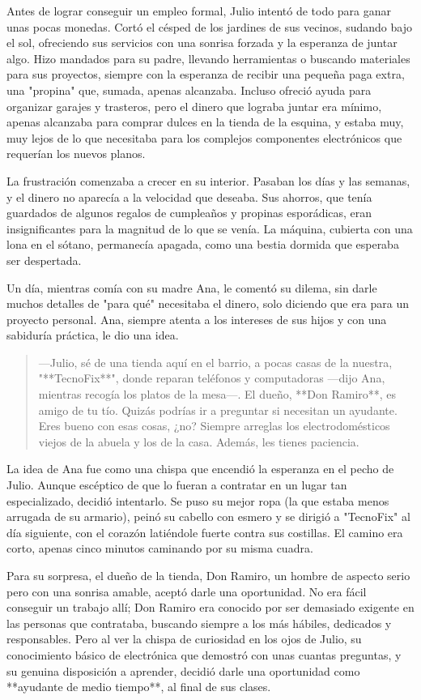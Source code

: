 \documentclass[a4paper,12pt]{book}
\begin{document}
Antes de lograr conseguir un empleo formal, Julio intentó de todo para ganar unas pocas monedas. Cortó el césped de los jardines de sus vecinos, sudando bajo el sol, ofreciendo sus servicios con una sonrisa forzada y la esperanza de juntar algo. Hizo mandados para su padre, llevando herramientas o buscando materiales para sus proyectos, siempre con la esperanza de recibir una pequeña paga extra, una "propina" que, sumada, apenas alcanzaba. Incluso ofreció ayuda para organizar garajes y trasteros, pero el dinero que lograba juntar era mínimo, apenas alcanzaba para comprar dulces en la tienda de la esquina, y estaba muy, muy lejos de lo que necesitaba para los complejos componentes electrónicos que requerían los nuevos planos.

La frustración comenzaba a crecer en su interior. Pasaban los días y las semanas, y el dinero no aparecía a la velocidad que deseaba. Sus ahorros, que tenía guardados de algunos regalos de cumpleaños y propinas esporádicas, eran insignificantes para la magnitud de lo que se venía. La máquina, cubierta con una lona en el sótano, permanecía apagada, como una bestia dormida que esperaba ser despertada.

Un día, mientras comía con su madre Ana, le comentó su dilema, sin darle muchos detalles de "para qué" necesitaba el dinero, solo diciendo que era para un proyecto personal. Ana, siempre atenta a los intereses de sus hijos y con una sabiduría práctica, le dio una idea.

\begin{quote}
    —Julio, sé de una tienda aquí en el barrio, a pocas casas de la nuestra, "**TecnoFix**", donde reparan teléfonos y computadoras —dijo Ana, mientras recogía los platos de la mesa—. El dueño, **Don Ramiro**, es amigo de tu tío. Quizás podrías ir a preguntar si necesitan un ayudante. Eres bueno con esas cosas, ¿no? Siempre arreglas los electrodomésticos viejos de la abuela y los de la casa. Además, les tienes paciencia.
\end{quote}

La idea de Ana fue como una chispa que encendió la esperanza en el pecho de Julio. Aunque escéptico de que lo fueran a contratar en un lugar tan especializado, decidió intentarlo. Se puso su mejor ropa (la que estaba menos arrugada de su armario), peinó su cabello con esmero y se dirigió a "TecnoFix" al día siguiente, con el corazón latiéndole fuerte contra sus costillas. El camino era corto, apenas cinco minutos caminando por su misma cuadra.

Para su sorpresa, el dueño de la tienda, Don Ramiro, un hombre de aspecto serio pero con una sonrisa amable, aceptó darle una oportunidad. No era fácil conseguir un trabajo allí; Don Ramiro era conocido por ser demasiado exigente en las personas que contrataba, buscando siempre a los más hábiles, dedicados y responsables. Pero al ver la chispa de curiosidad en los ojos de Julio, su conocimiento básico de electrónica que demostró con unas cuantas preguntas, y su genuina disposición a aprender, decidió darle una oportunidad como **ayudante de medio tiempo**, al final de sus clases.
\end{document}
